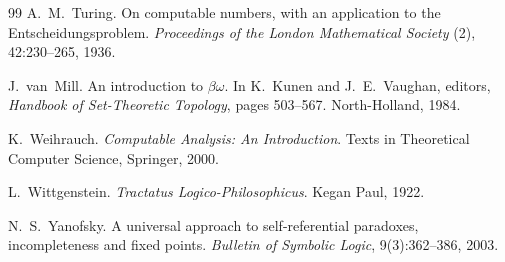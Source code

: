 \documentclass[]{article}
\theoremstyle{definition}
\theoremstyle{remark}
\begin{document}
\begin{thebibliography}{99}
 A.~M.~Turing. On computable numbers, with an application to the
Entscheidungsproblem. \emph{Proceedings of the London Mathematical Society} (2), 42:230--265, 1936.

 J.~van~Mill. An introduction to $\beta\omega$. In K.~Kunen and J.~E.~Vaughan,
editors, \emph{Handbook of Set-Theoretic Topology}, pages 503--567. North-Holland, 1984.

 K.~Weihrauch. \emph{Computable Analysis: An Introduction}. Texts in
Theoretical Computer Science, Springer, 2000.

 L.~Wittgenstein. \emph{Tractatus Logico-Philosophicus}. Kegan Paul, 1922.

 N.~S.~Yanofsky. A universal approach to self-referential paradoxes,
incompleteness and fixed points. \emph{Bulletin of Symbolic Logic}, 9(3):362--386, 2003.

\end{thebibliography}
\end{document}
